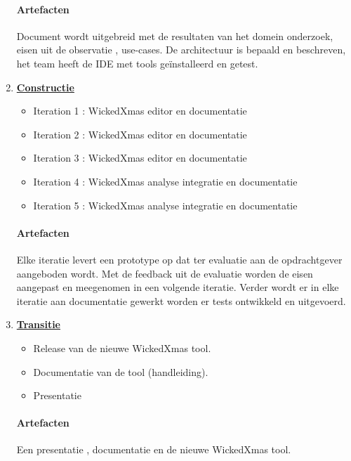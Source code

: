 \begin{enumerate}
	\paragraph{Artefacten}
	Document wordt uitgebreid met de resultaten van het domein onderzoek, eisen uit de observatie , use-cases. De architectuur is bepaald en beschreven, het team heeft de IDE met tools ge\"{i}nstalleerd en getest.   
	
\item \underline{\textbf{Constructie}}
		\begin{itemize}
			\item Iteration 1 : WickedXmas editor en documentatie
			\item Iteration 2 : WickedXmas editor en documentatie
			\item Iteration 3 : WickedXmas editor en documentatie
			\item Iteration 4 : WickedXmas analyse integratie en documentatie
			\item Iteration 5 : WickedXmas analyse integratie en documentatie
		\end{itemize}
		
		\paragraph{Artefacten}
		Elke iteratie levert een prototype op dat ter evaluatie aan de opdrachtgever aangeboden wordt. Met de feedback uit de evaluatie worden de eisen aangepast en meegenomen in een volgende iteratie. Verder wordt er in elke iteratie aan documentatie gewerkt worden er tests ontwikkeld en uitgevoerd.
		
\item \underline{\textbf{Transitie}}
	\begin{itemize}
		\item Release van de nieuwe WickedXmas tool.
		\item Documentatie van de tool (handleiding).
		\item Presentatie
	\end{itemize}
	\paragraph{Artefacten}
	Een presentatie , documentatie en de nieuwe WickedXmas tool.

\end{enumerate}








